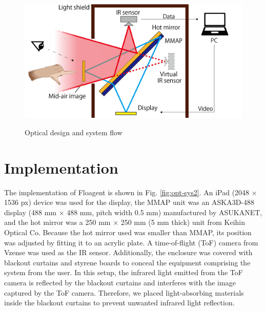 \documentclass[sigconf]{acmart}
\begin{document}
\begin{figure}[bt]
  \begin{center}
    \includegraphics[width=0.8\linewidth]{images/hot-MMAPs_system.png}
    \vspace{-0.8\baselineskip}
    \caption{Optical design and system flow}
    \vspace{-1.5\baselineskip}
    \label{fig:hot-MMAPs}
  \end{center}
\end{figure}

\section{Implementation \label{hard}}

The implementation of Floagent is shown in Fig. \ref{fig:opt-sys2}.
An iPad (2048 $\times$ 1536 px) device was used for the display, the MMAP unit was an ASKA3D-488 display (488 mm $\times$ 488 mm, pitch width 0.5 mm) manufactured by ASUKANET, and the hot mirror was a 250 mm $\times$ 250 mm (5 mm thick) unit from Keihin Optical Co.
Because the hot mirror used was smaller than MMAP, its position was adjusted by fitting it to an acrylic plate.
A time-of-flight (ToF) camera from Vzense was used as the IR sensor.
Additionally, the enclosure was covered with blackout curtains and styrene boards to conceal the equipment comprising the system from the user.
In this setup, the infrared light emitted from the ToF camera is reflected by the blackout curtains and interferes with the image captured by the ToF camera.
Therefore, we placed light-absorbing materials inside the blackout curtains to prevent unwanted infrared light reflection.
\end{document}
